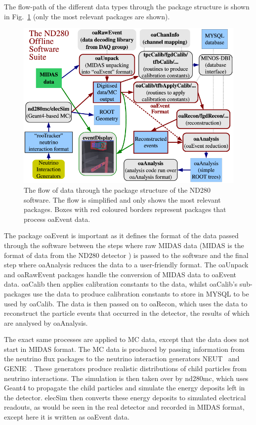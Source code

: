 \documentclass[aps,pra,12pt,notitlepage,tightenlines]{revtex4-1}
\begin{document}
The flow-path of the different data types through the package structure is shown in Fig.\ \ref{fig:struct} (only the most relevant packages are shown). 
\begin{figure}
 \includegraphics[scale=0.5]{struct.png}
 \caption{The flow of data through the package structure of the ND280 software. The flow is simplified and only shows the most relevant packages. Boxes with red coloured borders represent packages that process oaEvent data.~\cite{ABE2011106}}
 \label{fig:struct}
\end{figure}
The package oaEvent is important as it defines the format of the data passed through the software between the steps where raw MIDAS data (MIDAS is the format of data from the ND280 detector \cite{Ritt2001}) is passed to the software and the final step where oaAnalysis reduces the data to a user-friendly format. The oaUnpack and oaRawEvent packages handle the conversion of MIDAS data to oaEvent data. oaCalib then applies calibration constants to the data, whilst oaCalib's sub-packages use the data to produce calibration constants to store in MYSQL to be used by oaCalib. The data is then passed on to oaRecon, which uses the data to reconstruct the particle events that occurred in the detector, the results of which are analysed by oaAnalysis.

The exact same processes are applied to MC data, except that the data does not start in MIDAS format. The MC data is produced by passing information from the neutrino flux packages to the neutrino interaction generators NEUT~\cite{Hayato:2009zz} and GENIE~\cite{Andreopoulos2010}. These generators produce realistic distributions of child particles from neutrino interactions. The simulation is then taken over by nd280mc, which uses Geant4 to propagate the child particles and simulate the energy deposits left in the detector. elecSim then converts these energy deposits to simulated electrical readouts, as would be seen in the real detector and recorded in MIDAS format, except here it is written as oaEvent data.
 
\end{document}
